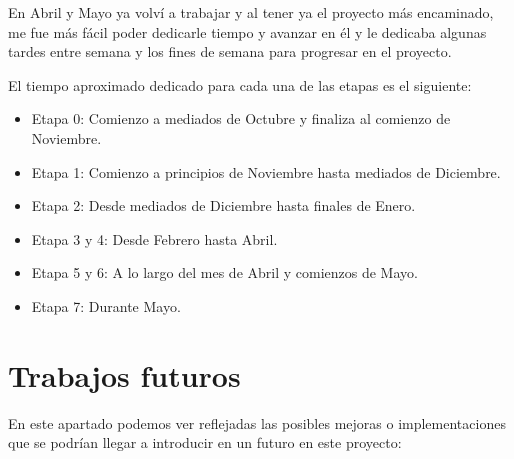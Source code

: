 \documentclass[a4paper, 12pt]{book}
\begin{document}
En Abril y Mayo ya volví a trabajar y al tener ya el proyecto más encaminado, me fue más fácil poder dedicarle tiempo y avanzar en él y le dedicaba algunas tardes entre semana y los fines de semana para progresar en el proyecto.

El tiempo aproximado dedicado para cada una de las etapas es el siguiente:

\begin{itemize}
    \item Etapa 0: Comienzo a mediados de Octubre y finaliza al comienzo de Noviembre.

    \item Etapa 1: Comienzo a principios de Noviembre hasta mediados de Diciembre.

    \item Etapa 2: Desde mediados de Diciembre hasta finales de Enero.

    \item Etapa 3 y 4: Desde Febrero hasta Abril.

    \item Etapa 5 y 6: A lo largo del mes de Abril y comienzos de Mayo.

    \item Etapa 7: Durante Mayo.
\end{itemize}

\newpage
\section{Trabajos futuros}
\label{sec:trabajos_futuros}

En este apartado podemos ver reflejadas las posibles mejoras o implementaciones que se podrían llegar a introducir en un futuro en este proyecto:
\end{document}

